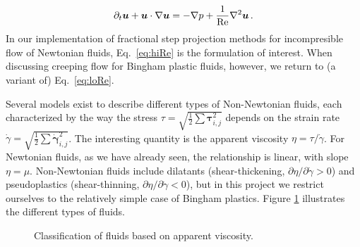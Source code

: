 \documentclass[final,3p,twocolumn]{elsarticle}
\begin{document}
\begin{equation}
    \partial_t \bm{u} + \bm{u} \cdot \nabla \bm{u} = - \nabla p
    + \frac{1}{\rm Re} \nabla^2 \bm {u} \,.
    \label{eq:hiRe}
\end{equation}
%
In our implementation of fractional step projection methods for incompresible
flow of Newtonian fluids, Eq.\ \eqref{eq:hiRe} is the formulation of interest.
When discussing creeping flow for Bingham plastic fluids, however, we return to
(a variant of) Eq.\ \eqref{eq:loRe}. 

Several models exist to describe different types of Non-Newtonian fluids, each
characterized by the way the stress $\tau = \sqrt{\frac{1}{2} \sum
\bm{\tau}_{i,j}^2}$ depends on the strain rate $\dot{\gamma} =
\sqrt{\frac{1}{2} \sum \dot{\bm{\gamma}}_{i,j}^2}$. The interesting quantity is
the apparent viscosity $\eta = \tau/ \dot{\gamma}$. For Newtonian fluids, as we
have already seen, the relationship is linear, with slope $\eta = \mu$.
Non-Newtonian fluids include dilatants (shear-thickening, $\partial
\eta/\partial \dot{\gamma} > 0$) and pseudoplastics (shear-thinning, $\partial
\eta/\partial \dot{\gamma} < 0$), but in this project we restrict ourselves to
the relatively simple case of Bingham plastics. Figure \ref{fig:fluids}
illustrates the different types of fluids. 

\begin{figure}[htb]
    \centering
    \caption{Classification of fluids based on apparent viscosity.}
    \label{fig:fluids}
\end{figure}
\end{document}
